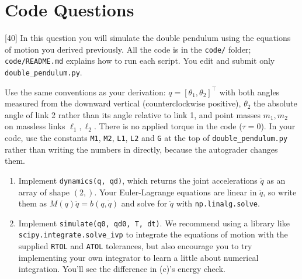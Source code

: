 \documentclass{16384_doc}
\begin{document}
\maketitle

\tableofcontents

\section{Code Questions}

\begin{questions}
    [40]
    In this question you will simulate the double pendulum using the equations of motion you derived previously. All the code is in the \verb!code/! folder; \verb!code/README.md! explains how to run each script. You edit and submit only \verb!double_pendulum.py!.

    Use the same conventions as your derivation: $q = [\theta_1, \theta_2]^\top$ with both angles measured from the downward vertical (counterclockwise positive), $\theta_2$ the absolute angle of link 2 rather than its angle relative to link 1, and point masses $m_1, m_2$ on massless links $\ell_1, \ell_2$. There is no applied torque in the code ($\tau = 0$). In your code, use the constants \verb!M1!, \verb!M2!, \verb!L1!, \verb!L2! and \verb!G! at the top of \verb!double_pendulum.py! rather than writing the numbers in directly, because the autograder changes them.

    \begin{enumerate}[label=\alph*.]
        \item \text{[20 points]} Implement \verb!dynamics(q, qd)!, which returns the joint accelerations $\ddot q$ as an array of shape $(2,)$. Your Euler-Lagrange equations are linear in $\ddot q$, so write them as $M(q)\ddot q = b(q, \dot q)$ and solve for $\ddot q$ with \verb!np.linalg.solve!.

        \item \text{[15 points]} Implement \verb!simulate(q0, qd0, T, dt)!. We recommend using a library like \verb!scipy.integrate.solve_ivp! to integrate the equations of motion with the supplied \verb|RTOL| and \verb|ATOL| tolerances, but also encourage you to try implementing your own integrator to learn a little about numerical integration. You'll see the difference in (c)'s energy check.


\end{enumerate}
\end{questions}
\end{document}
